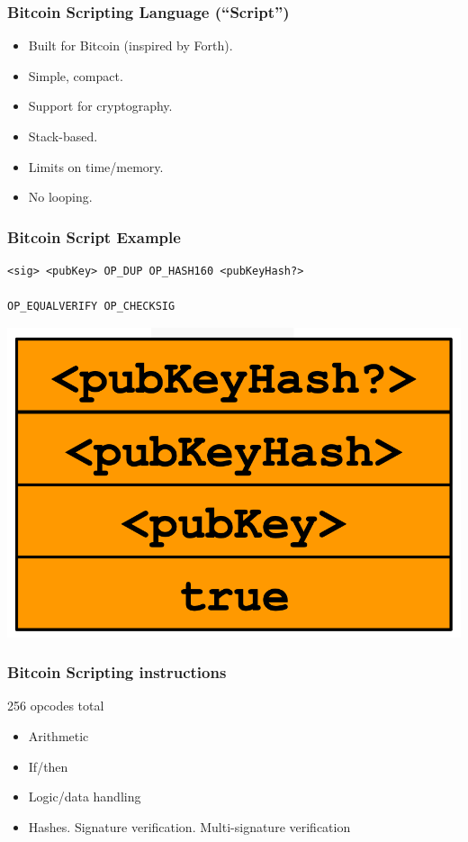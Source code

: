 \documentclass{beamer}
\begin{document}
\begin{frame}
  \frametitle{Bitcoin Scripting Language (``Script'')}
  
  \begin{itemize}
  	\item Built for Bitcoin (inspired by Forth). 
	\item Simple, compact.
	\item Support for cryptography.
	\item Stack-based.
	\item Limits on time/memory.
	\item No looping.

  \end{itemize}
  
\end{frame}
\begin{frame}[fragile]
  \frametitle{Bitcoin Script Example}
  
  \begin{verbatim}
<sig> <pubKey> OP_DUP OP_HASH160 <pubKeyHash?> 
																OP_EQUALVERIFY OP_CHECKSIG
  \end{verbatim}
  
  \pause
  \centering
	\includegraphics[scale=0.3]{7}
\end{frame}
\begin{frame}
  \frametitle{Bitcoin Scripting instructions}
  256 opcodes total
  \begin{itemize}
  	\item Arithmetic
	\item If/then
	\item Logic/data handling \pause
	\item Hashes. Signature verification. Multi-signature verification
  \end{itemize}
  
\end{frame}
\end{document}

